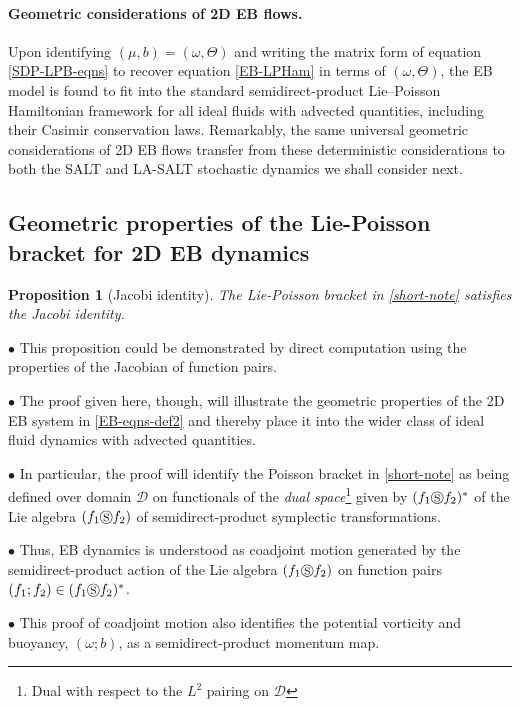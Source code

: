 \documentclass[11pt, oneside]{article}   	%
\numberwithin{equation}{section}
\theoremstyle{plain}
\newtheorem{proposition}[theorem]{Proposition}
\theoremstyle{definition}
\theoremstyle{remark}
\newcommand{\<}{\langle}
\renewcommand{\>}{\rangle}
\begin{document}
\paragraph{Geometric considerations of 2D EB flows.} Upon identifying $(\mu,b)=(\omega,\Theta)$ and writing the matrix form of equation \eqref{SDP-LPB-eqns} to recover equation \eqref{EB-LPHam}  in terms of  $(\omega,\Theta)$, the EB model is found to fit into the standard semidirect-product Lie--Poisson Hamiltonian framework for all ideal fluids with advected quantities, including their Casimir conservation laws. Remarkably, the same universal geometric considerations of 2D EB flows transfer from these deterministic considerations to both the SALT and LA-SALT stochastic dynamics we shall consider next.


\subsection{Geometric properties of the Lie-Poisson bracket for 2D EB dynamics}

\begin{proposition}[Jacobi identity]\label{LPB-EB5}
The Lie-Poisson bracket in \eqref{short-note} satisfies the Jacobi identity.  
\end{proposition}

$\bullet$  This proposition could be demonstrated by direct computation using the properties of the Jacobian of function pairs. 
\medskip

$\bullet$  The proof given here, though, will illustrate the geometric properties of the 2D EB system in \eqref{EB-eqns-def2} and thereby place it into the wider class of ideal fluid dynamics with advected quantities. \medskip {}

$\bullet$  In particular, the proof will identify the Poisson bracket in \eqref{short-note} as being defined over domain $\mathcal D$ on functionals of the \emph{dual space}\footnote{Dual with respect to the  $L^2$ pairing on ${\mathcal D}$} given by $(f_1\circledS f_2)^*$ of the Lie algebra  $(f_1\circledS f_2)$ of semidirect-product symplectic transformations. 
\medskip

$\bullet$  Thus, EB dynamics is understood as coadjoint motion generated by the semidirect-product action of the Lie algebra $(f_1\circledS f_2)$ on function pairs $(f_1;f_2)\in (f_1\circledS f_2)^*$. 
\medskip

$\bullet$  This proof of coadjoint motion also identifies the potential vorticity and buoyancy, $(\omega;b)$, as a semidirect-product momentum map.   
\end{document}
